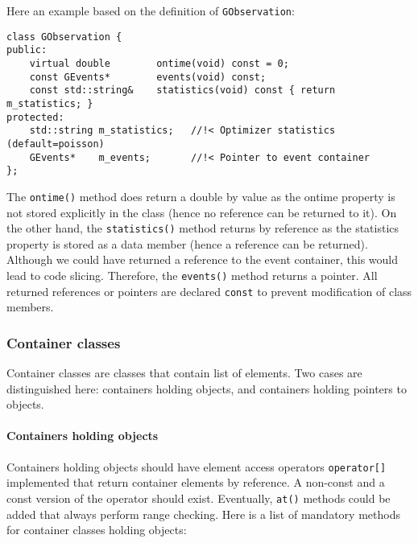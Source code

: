 \documentclass{article}[12pt,a4]
\begin{document}
Here an example based on the definition of {\tt GObservation}:
\begin{verbatim}
class GObservation {
public:
    virtual double        ontime(void) const = 0;
    const GEvents*        events(void) const;
    const std::string&    statistics(void) const { return m_statistics; }
protected:
    std::string m_statistics;   //!< Optimizer statistics (default=poisson)
    GEvents*    m_events;       //!< Pointer to event container
};
\end{verbatim}
The {\tt ontime()} method does return a double by value as the ontime property is not
stored explicitly in the class (hence no reference can be returned to it).
On the other hand, the {\tt statistics()} method returns by reference as the statistics
property is stored as a data member (hence a reference can be returned).
Although we could have returned a reference to the event container, this would lead
to code slicing.
Therefore, the {\tt events()} method returns a pointer.
All returned references or pointers are declared {\tt const} to prevent modification of
class members.


\subsubsection{Container classes}
\label{sec:containers}

Container classes are classes that contain list of elements.
Two cases are distinguished here: containers holding objects, and containers holding
pointers to objects.

\paragraph{Containers holding objects}

Containers holding objects should have element access operators {\tt operator[]} implemented
that return container elements by reference.
A non-const and a const version of the operator should exist.
Eventually, {\tt at()} methods could be added that always perform range checking.
Here is a list of mandatory methods for container classes holding objects:
\end{document}
